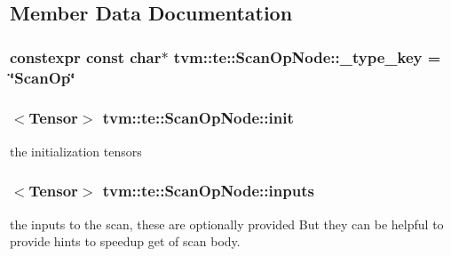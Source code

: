 \subsection{Member Data Documentation}
\subsubsection[{\texorpdfstring{\+\_\+type\+\_\+key}{_type_key}}]{\setlength{\rightskip}{0pt plus 5cm}constexpr const char$\ast$ tvm\+::te\+::\+Scan\+Op\+Node\+::\+\_\+type\+\_\+key = \char`\"{}Scan\+Op\char`\"{}\hspace{0.3cm}{\ttfamily [static]}}\hypertarget{classtvm_1_1te_1_1ScanOpNode_ae42d84d29ba756a6f9061ea13ad26b74}{}\label{classtvm_1_1te_1_1ScanOpNode_ae42d84d29ba756a6f9061ea13ad26b74}
\subsubsection[{\texorpdfstring{init}{init}}]{$<${\bf Tensor}$>$ tvm\+::te\+::\+Scan\+Op\+Node\+::init}\hypertarget{classtvm_1_1te_1_1ScanOpNode_a729243cd385db2e3f74c3a92a44db935}{}\label{classtvm_1_1te_1_1ScanOpNode_a729243cd385db2e3f74c3a92a44db935}


the initialization tensors 

\subsubsection[{\texorpdfstring{inputs}{inputs}}]{$<${\bf Tensor}$>$ tvm\+::te\+::\+Scan\+Op\+Node\+::inputs}\hypertarget{classtvm_1_1te_1_1ScanOpNode_abcc62af0d7da8d97d9065fd82230162b}{}\label{classtvm_1_1te_1_1ScanOpNode_abcc62af0d7da8d97d9065fd82230162b}


the inputs to the scan, these are optionally provided But they can be helpful to provide hints to speedup get of scan body. 

